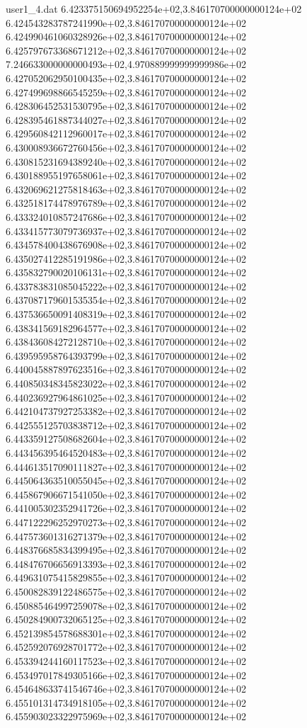 \begin{filecontents}{user1_4.dat}
6.423375150694952254e+02,3.846170700000000124e+02
6.424543283787241990e+02,3.846170700000000124e+02
6.424990461060328926e+02,3.846170700000000124e+02
6.425797673368671212e+02,3.846170700000000124e+02
7.246633000000000493e+02,4.970889999999999986e+02
6.427052062950100435e+02,3.846170700000000124e+02
6.427499698866545259e+02,3.846170700000000124e+02
6.428306452531530795e+02,3.846170700000000124e+02
6.428395461887344027e+02,3.846170700000000124e+02
6.429560842112960017e+02,3.846170700000000124e+02
6.430008936672760456e+02,3.846170700000000124e+02
6.430815231694389240e+02,3.846170700000000124e+02
6.430188955197658061e+02,3.846170700000000124e+02
6.432069621275818463e+02,3.846170700000000124e+02
6.432518174478976789e+02,3.846170700000000124e+02
6.433324010857247686e+02,3.846170700000000124e+02
6.433415773079736937e+02,3.846170700000000124e+02
6.434578400438676908e+02,3.846170700000000124e+02
6.435027412285191986e+02,3.846170700000000124e+02
6.435832790020106131e+02,3.846170700000000124e+02
6.433783831085045222e+02,3.846170700000000124e+02
6.437087179601535354e+02,3.846170700000000124e+02
6.437536650091408319e+02,3.846170700000000124e+02
6.438341569182964577e+02,3.846170700000000124e+02
6.438436084272128710e+02,3.846170700000000124e+02
6.439595958764393799e+02,3.846170700000000124e+02
6.440045887897623516e+02,3.846170700000000124e+02
6.440850348345823022e+02,3.846170700000000124e+02
6.440236927964861025e+02,3.846170700000000124e+02
6.442104737927253382e+02,3.846170700000000124e+02
6.442555125703838712e+02,3.846170700000000124e+02
6.443359127508682604e+02,3.846170700000000124e+02
6.443456395464520483e+02,3.846170700000000124e+02
6.444613517090111827e+02,3.846170700000000124e+02
6.445064363510055045e+02,3.846170700000000124e+02
6.445867906671541050e+02,3.846170700000000124e+02
6.441005302352941726e+02,3.846170700000000124e+02
6.447122296252970273e+02,3.846170700000000124e+02
6.447573601316271379e+02,3.846170700000000124e+02
6.448376685834399495e+02,3.846170700000000124e+02
6.448476706656913393e+02,3.846170700000000124e+02
6.449631075415829855e+02,3.846170700000000124e+02
6.450082839122486575e+02,3.846170700000000124e+02
6.450885464997259078e+02,3.846170700000000124e+02
6.450284900732065125e+02,3.846170700000000124e+02
6.452139854578688301e+02,3.846170700000000124e+02
6.452592076928701772e+02,3.846170700000000124e+02
6.453394244160117523e+02,3.846170700000000124e+02
6.453497017849305166e+02,3.846170700000000124e+02
6.454648633741546746e+02,3.846170700000000124e+02
6.455101314734918105e+02,3.846170700000000124e+02
6.455903023322975969e+02,3.846170700000000124e+02

\end{filecontents}
